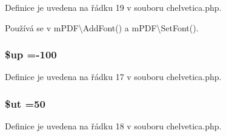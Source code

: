 Definice je uvedena na řádku 19 v souboru chelvetica.\-php.



Používá se v m\-P\-D\-F\textbackslash{}\-Add\-Font() a m\-P\-D\-F\textbackslash{}\-Set\-Font().

\hypertarget{chelvetica_8php_a6b5ad2ac55f9df46e8f34e78fbd6f176}{
\subsubsection[{\$up}]{\setlength{\rightskip}{0pt plus 5cm}\$up =-\/100}}\label{chelvetica_8php_a6b5ad2ac55f9df46e8f34e78fbd6f176}


Definice je uvedena na řádku 17 v souboru chelvetica.\-php.

\hypertarget{chelvetica_8php_aadd3f841051043ee58e587e840e8dd0b}{
\subsubsection[{\$ut}]{\setlength{\rightskip}{0pt plus 5cm}\$ut =50}}\label{chelvetica_8php_aadd3f841051043ee58e587e840e8dd0b}


Definice je uvedena na řádku 18 v souboru chelvetica.\-php.

